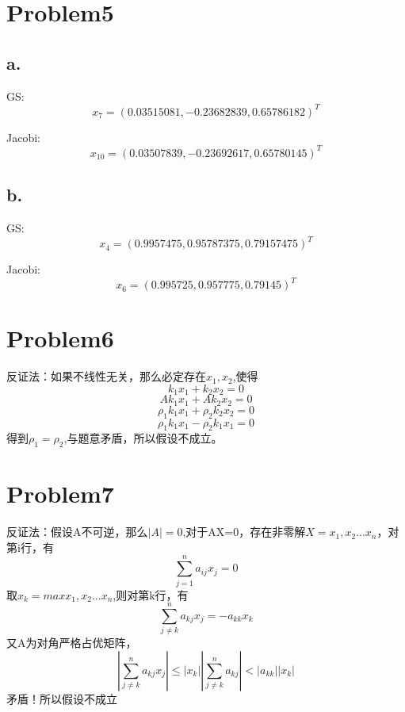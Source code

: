 \documentclass{article}
\begin{document}
\section{Problem5}
\subsection{a.}
GS:$$x_7 = ( 0.03515081,-0.23682839, 0.65786182)^T$$\par
Jacobi:$$x_{10} =(0.03507839,-0.23692617, 0.65780145)^T$$
\subsection{b.}
GS:$$x_4 = (0.9957475 ,0.95787375,0.79157475)^T$$\par
Jacobi:$$x_6 =(0.995725,0.957775,0.79145 )^T$$
\section{Problem6}
反证法：如果不线性无关，那么必定存在$x_1,x_2$,使得
$$k_1 x_1+k_2x_2=0$$
$$Ak_1 x_1+Ak_2x_2=0$$
$$\rho_1k_1 x_1+\rho_2k_2x_2=0$$
$$\rho_1k_1 x_1-\rho_2k_1x_1=0$$
得到$\rho_1=\rho_2$,与题意矛盾，所以假设不成立。
\section{Problem7}
反证法：假设A不可逆，那么$|A|=0$,对于AX=0，存在非零解$X={x_1,x_2...x_n}$，对第i行，有
$$ \sum_{j=1}^{n}a_{ij}x_j=0 $$
取$x_k=max{x_1,x_2...x_n}$,则对第k行，有
$$ \sum_{j\neq k}^{n}a_{kj}x_j=-a_{kk}x_k $$
又A为对角严格占优矩阵，$$ |\sum_{j\neq k}^{n}a_{kj}x_j|\leq|x_k||\sum_{j\neq k}^{n}a_{kj}|<|a_{kk}||x_k|$$
矛盾！所以假设不成立
\end{document}
